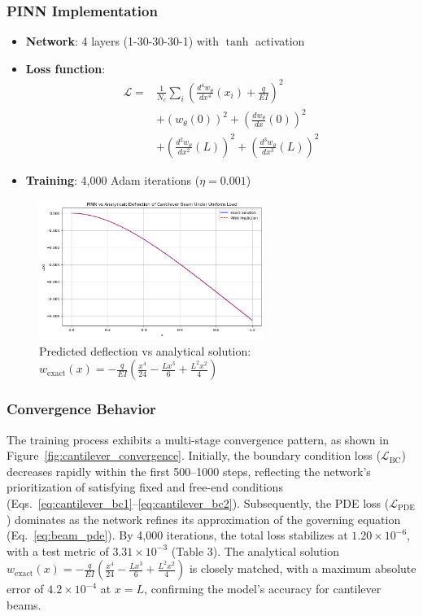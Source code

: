 \documentclass[12pt]{article}
\begin{document}
\subsubsection{PINN Implementation}
\begin{itemize}
	\item \textbf{Network}: 4 layers (1-30-30-30-1) with $\tanh$ activation
	\item \textbf{Loss function}:
	\begin{align*}
		\mathcal{L} = &\frac{1}{N_c}\sum_{i}\left(\frac{d^4w_{\theta}}{dx^4}(x_i) + \frac{q}{EI}\right)^2 \\
		&+ \left(w_{\theta}(0)\right)^2 + \left(\frac{dw_{\theta}}{dx}(0)\right)^2 \\
		&+ \left(\frac{d^2w_{\theta}}{dx^2}(L)\right)^2 + \left(\frac{d^3w_{\theta}}{dx^3}(L)\right)^2
	\end{align*}
	\item \textbf{Training}: 4,000 Adam iterations ($\eta=0.001$)
\end{itemize}

\begin{figure}[htbp]
	\centering
	\includegraphics[width=0.65\textwidth]{cantilever_results.png}
	\caption{Predicted deflection vs analytical solution: $w_{\text{exact}}(x) = -\frac{q}{EI}\left(\frac{x^4}{24} - \frac{Lx^3}{6} + \frac{L^2x^2}{4}\right)$}
	\label{fig:cantilever}
\end{figure}

\subsubsection{Convergence Behavior}
The training process exhibits a multi-stage convergence pattern, as shown in Figure~\ref{fig:cantilever_convergence}. Initially, the boundary condition loss ($\mathcal{L}_{\text{BC}}$) decreases rapidly within the first 500--1000 steps, reflecting the network's prioritization of satisfying fixed and free-end conditions (Eqs.~\ref{eq:cantilever_bc1}--\ref{eq:cantilever_bc2}). Subsequently, the PDE loss ($\mathcal{L}_{\text{PDE}}$) dominates as the network refines its approximation of the governing equation (Eq.~\ref{eq:beam_pde}). By 4,000 iterations, the total loss stabilizes at $1.20 \times 10^{-6}$, with a test metric of $3.31 \times 10^{-3}$ (Table 3). The analytical solution $w_{\text{exact}}(x) = -\frac{q}{EI}\left(\frac{x^4}{24} - \frac{Lx^3}{6} + \frac{L^2x^2}{4}\right)$ is closely matched, with a maximum absolute error of $4.2 \times 10^{-4}$ at $x=L$, confirming the model's accuracy for cantilever beams.
\end{document}
